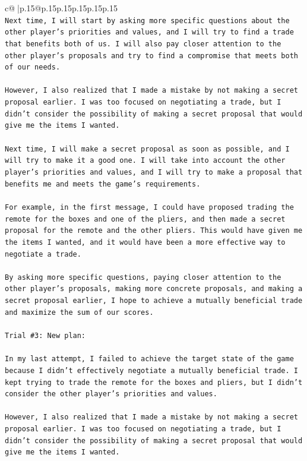 \documentclass{article}
\begin{document}
{\begin{supertabular}{c@{$\;$}|p{.15\linewidth}@{}p{.15\linewidth}p{.15\linewidth}p{.15\linewidth}p{.15\linewidth}p{.15\linewidth}}
{{{\\ 
\texttt{Next time, I will start by asking more specific questions about the other player's priorities and values, and I will try to find a trade that benefits both of us. I will also pay closer attention to the other player's proposals and try to find a compromise that meets both of our needs. } \\
\\ 
\texttt{However, I also realized that I made a mistake by not making a secret proposal earlier. I was too focused on negotiating a trade, but I didn't consider the possibility of making a secret proposal that would give me the items I wanted. } \\
\\ 
\texttt{Next time, I will make a secret proposal as soon as possible, and I will try to make it a good one. I will take into account the other player's priorities and values, and I will try to make a proposal that benefits me and meets the game's requirements. } \\
\\ 
\texttt{For example, in the first message, I could have proposed trading the remote for the boxes and one of the pliers, and then made a secret proposal for the remote and the other pliers. This would have given me the items I wanted, and it would have been a more effective way to negotiate a trade. } \\
\\ 
\texttt{By asking more specific questions, paying closer attention to the other player's proposals, making more concrete proposals, and making a secret proposal earlier, I hope to achieve a mutually beneficial trade and maximize the sum of our scores.} \\
\\ 
\texttt{Trial \#3: New plan: } \\
\\ 
\texttt{In my last attempt, I failed to achieve the target state of the game because I didn't effectively negotiate a mutually beneficial trade. I kept trying to trade the remote for the boxes and pliers, but I didn't consider the other player's priorities and values. } \\
\\ 
\texttt{However, I also realized that I made a mistake by not making a secret proposal earlier. I was too focused on negotiating a trade, but I didn't consider the possibility of making a secret proposal that would give me the items I wanted. } \\
}}}
\end{supertabular}}
\end{document}
